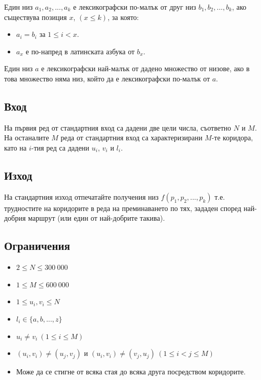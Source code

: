 \documentclass[12pt]{article}
\begin{document}
\vspace{12pt}

Един низ $a_1,a_2,...,a_k$ е лексикографски по-малък от друг низ $b_1,b_2,...,b_k$, ако съществува позиция $x$, $(x \leq k)$, за която:
\begin{itemize}
    \setlength{\itemindent}{6pt}
    \item $a_i = b_i$ за $1 \leq i < x$.
    \item $a_x$ е по-напред в латинската азбука от $b_x$.
\end{itemize}

\vspace{6pt}

Един низ $a$ е лексикографски най-малък от дадено множество от низове, ако в това множество няма низ, който да е лексикографски по-малък от $a$.

\vspace{12pt}

\subsection{Вход}
На първия ред от стандартния вход са дадени две цели числа, съответно $N$ и $M$. На останалите $M$ реда от стандартния вход са характеризирани $M$-те коридора, като на $i$-тия ред са дадени $u_i$, $v_i$ и $l_i$.

\subsection{Изход}
На стандартния изход отпечатайте получения низ $f(p_1,p_2,...,p_k)$ т.е. трудностите на коридорите в реда на преминаването по тях, зададен според най-добрия маршрут (или един от най-добрите такива).
 
\subsection{Ограничения}
\vspace{0.1em}
\begin{itemize}
	\item $2 \leq N \leq 300\ 000$
	\item $1 \leq M \leq 600\ 000$
    \item $1 \leq u_i, v_i \leq N$
    \item $l_i \in \{a, b, ..., z\}$
    \item $u_i \neq v_i\ (1 \leq i \leq M)$
    \item $(u_i,v_i) \neq (u_j,v_j)$ и $(u_i,v_i) \neq (v_j,u_j)\ (1 \leq i < j \leq M)$
    \item Може да се стигне от всяка стая до всяка друга посредством коридорите. 
\end{itemize}
\end{document}
